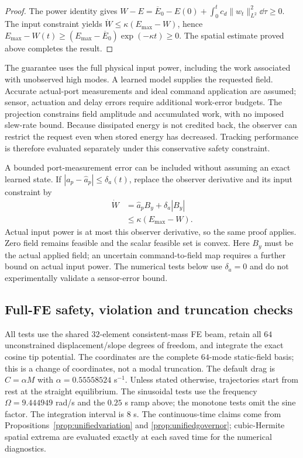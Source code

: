 \begin{proof}
The power identity gives $W-E=\overline E_0-E(0)
+\int_0^t c_d\|w_t\|_{L^2}^2\dd\tau\geq0$.
The input constraint yields
$\dot W\leq\kappa(E_{\max}-W)$, hence
$E_{\max}-W(t)\geq
(E_{\max}-\overline E_0)\exp(-\kappa t)\geq0$.
The spatial estimate proved above completes the result.
\end{proof}

The guarantee uses the full physical input power, including the work
associated with unobserved high modes. A learned model supplies the
requested field. Accurate actual-port measurements and ideal command
application are assumed; sensor, actuation and delay errors require
additional work-error budgets. The projection constrains field amplitude
and accumulated work, with no imposed slew-rate bound. Because dissipated
energy is not credited back, the observer can restrict the request even
when stored energy has decreased. Tracking performance is therefore
evaluated separately under this conservative safety constraint.

A bounded port-measurement error can be included without assuming an exact
learned state.  If $|a_p-\widehat a_p|\leq\delta_a(t)$, replace the observer
derivative and its input constraint by
\begin{equation}
 \begin{aligned}
 \dot W&=\widehat a_p B_y+\delta_a|B_y|\\
       &\leq\kappa(E_{\max}-W).
 \end{aligned}
 \label{eq:unifiedrobustport}
\end{equation}
Actual input power is at most this observer derivative, so the same proof
applies.  Zero field remains feasible and the scalar feasible set is convex.
Here $B_y$ must be the actual applied field; an uncertain command-to-field
map requires a further bound on actual input power.  The numerical tests
below use $\delta_a=0$ and do not experimentally validate a sensor-error bound.

\subsection{Full-FE safety, violation and truncation checks}
\label{sec:unifiedsafetytests}
All tests use the shared $32$-element consistent-mass FE beam, retain all
$64$ unconstrained displacement/slope degrees of freedom, and integrate
the exact cosine tip potential.  The coordinates are the complete
$64$-mode static-field basis; this is a change of coordinates, not a
modal truncation.  The default drag is $C=\alpha M$ with
$\alpha=0.55558524$ s$^{-1}$.  Unless stated otherwise, trajectories start
from rest at the straight equilibrium.  The sinusoidal tests use the
frequency $\Omega=9.444949$ rad/s and the $0.25$ s ramp above; the monotone
tests omit the sine factor.  The integration interval is $8$ s.
The continuous-time claims come from Propositions~\ref{prop:unifiedvariation}
and \ref{prop:unifiedgovernor}; cubic-Hermite spatial extrema are evaluated
exactly at each saved time for the numerical diagnostics.

